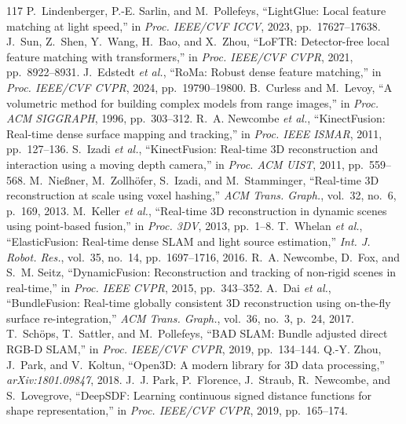 \documentclass[10pt,journal]{IEEEtran}
\begin{document}
{\begin{thebibliography}{117}
 P.~Lindenberger, P.-E. Sarlin, and M.~Pollefeys, ``LightGlue: Local feature matching at light speed,'' in \emph{Proc. IEEE/CVF ICCV}, 2023, pp.~17627--17638.
 J.~Sun, Z.~Shen, Y.~Wang, H.~Bao, and X.~Zhou, ``LoFTR: Detector-free local feature matching with transformers,'' in \emph{Proc. IEEE/CVF CVPR}, 2021, pp.~8922--8931.
 J.~Edstedt \emph{et al.}, ``RoMa: Robust dense feature matching,'' in \emph{Proc. IEEE/CVF CVPR}, 2024, pp.~19790--19800.
 B.~Curless and M.~Levoy, ``A volumetric method for building complex models from range images,'' in \emph{Proc. ACM SIGGRAPH}, 1996, pp.~303--312.
 R.~A. Newcombe \emph{et al.}, ``KinectFusion: Real-time dense surface mapping and tracking,'' in \emph{Proc. IEEE ISMAR}, 2011, pp.~127--136.
 S.~Izadi \emph{et al.}, ``KinectFusion: Real-time 3D reconstruction and interaction using a moving depth camera,'' in \emph{Proc. ACM UIST}, 2011, pp.~559--568.
 M.~Nie{\ss}ner, M.~Zollh\"ofer, S.~Izadi, and M.~Stamminger, ``Real-time 3D reconstruction at scale using voxel hashing,'' \emph{ACM Trans. Graph.}, vol.~32, no.~6, p.~169, 2013.
 M.~Keller \emph{et al.}, ``Real-time 3D reconstruction in dynamic scenes using point-based fusion,'' in \emph{Proc. 3DV}, 2013, pp.~1--8.
 T.~Whelan \emph{et al.}, ``ElasticFusion: Real-time dense SLAM and light source estimation,'' \emph{Int. J. Robot. Res.}, vol.~35, no.~14, pp.~1697--1716, 2016.
 R.~A. Newcombe, D.~Fox, and S.~M. Seitz, ``DynamicFusion: Reconstruction and tracking of non-rigid scenes in real-time,'' in \emph{Proc. IEEE CVPR}, 2015, pp.~343--352.
 A.~Dai \emph{et al.}, ``BundleFusion: Real-time globally consistent 3D reconstruction using on-the-fly surface re-integration,'' \emph{ACM Trans. Graph.}, vol.~36, no.~3, p.~24, 2017.
 T.~Sch\"ops, T.~Sattler, and M.~Pollefeys, ``BAD SLAM: Bundle adjusted direct RGB-D SLAM,'' in \emph{Proc. IEEE/CVF CVPR}, 2019, pp.~134--144.
 Q.-Y. Zhou, J.~Park, and V.~Koltun, ``Open3D: A modern library for 3D data processing,'' \emph{arXiv:1801.09847}, 2018.
 J.~J. Park, P.~Florence, J.~Straub, R.~Newcombe, and S.~Lovegrove, ``DeepSDF: Learning continuous signed distance functions for shape representation,'' in \emph{Proc. IEEE/CVF CVPR}, 2019, pp.~165--174.

\end{thebibliography}}
\end{document}
